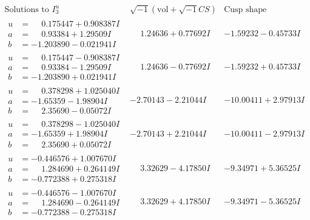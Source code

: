 \documentclass[1p]{elsarticle_modified}
\theoremstyle{definition}
\newcommand{\I}{\sqrt{-1}}
\begin{document}
$$\begin{array}{c|c|c}  
\text{Solutions to }I^u_{3}& \I (\text{vol} + \sqrt{-1}CS) & \text{Cusp shape}\\
 \hline 
\begin{aligned}
u &= \phantom{-}0.175447 + 0.908387 I \\
a &= \phantom{-}0.93384 + 1.29509 I \\
b &= -1.203890 - 0.021941 I\end{aligned}
 & \phantom{-}1.24636 + 0.77692 I & -1.59232 - 0.45733 I \\ \hline\begin{aligned}
u &= \phantom{-}0.175447 - 0.908387 I \\
a &= \phantom{-}0.93384 - 1.29509 I \\
b &= -1.203890 + 0.021941 I\end{aligned}
 & \phantom{-}1.24636 - 0.77692 I & -1.59232 + 0.45733 I \\ \hline\begin{aligned}
u &= \phantom{-}0.378298 + 1.025040 I \\
a &= -1.65359 - 1.98904 I \\
b &= \phantom{-}2.35690 - 0.05072 I\end{aligned}
 & -2.70143 - 2.21044 I & -10.00411 + 2.97913 I \\ \hline\begin{aligned}
u &= \phantom{-}0.378298 - 1.025040 I \\
a &= -1.65359 + 1.98904 I \\
b &= \phantom{-}2.35690 + 0.05072 I\end{aligned}
 & -2.70143 + 2.21044 I & -10.00411 - 2.97913 I \\ \hline\begin{aligned}
u &= -0.446576 + 1.007670 I \\
a &= \phantom{-}1.284690 + 0.264149 I \\
b &= -0.772388 + 0.275318 I\end{aligned}
 & \phantom{-}3.32629 - 4.17850 I & -9.34971 + 5.36525 I \\ \hline\begin{aligned}
u &= -0.446576 - 1.007670 I \\
a &= \phantom{-}1.284690 - 0.264149 I \\
b &= -0.772388 - 0.275318 I\end{aligned}
 & \phantom{-}3.32629 + 4.17850 I & -9.34971 - 5.36525 I \\ \hline\begin{aligned}

\end{aligned}
\end{array}$$
\end{document}
